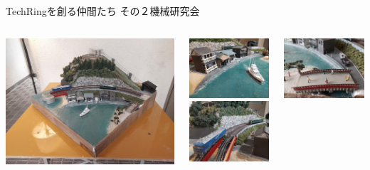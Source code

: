\documentclass[dvipdfmx]{beamer}
\begin{document}
\begin{frame}{TechRingを創る仲間たち その２}{機械研究会}
  \begin{columns}
    \begin{column}{0.5\textwidth}
      \includegraphics[scale=0.45]{pic/mekaken1.jpg}
    \end{column}
    \begin{column}{0.22\textwidth}
      \includegraphics[scale=0.45]{pic/mekaken2.jpg}\\
      \includegraphics[scale=0.45]{pic/mekaken3.jpg}
    \end{column}
    \begin{column}{0.25\textwidth}
      \includegraphics[scale=0.45]{pic/mekaken4.jpg}\\

\end{column}
\end{columns}
\end{frame}
\end{document}
